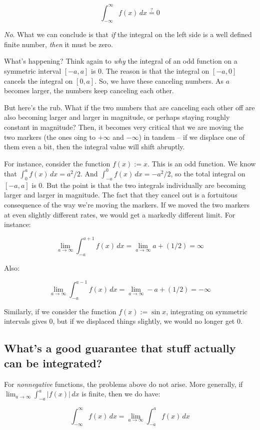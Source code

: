 \documentclass[10pt]{amsart}
\begin{document}
$$\int_{-\infty}^\infty f(x) \, dx \stackrel{?}{=} 0$$

{\em No}. What we can conclude is that {\em if} the integral on the
left side is a well defined finite number, {\em then} it must be zero.

What's happening? Think again to {\em why} the integral of an odd
function on a symmetric interval $[-a,a]$ is $0$. The reason is that
the integral on $[-a,0]$ cancels the integral on $[0,a]$. So, we have
these canceling numbers. As $a$ becomes larger, the numbers keep
canceling each other.

But here's the rub. What if the two numbers that are canceling each
other off are also becoming larger and larger in magnitude, or perhaps
staying roughly constant in magnitude? Then, it becomes very critical
that we are moving the two markers (the ones oing to $+\infty$ and
$-\infty$) in tandem -- if we displace one of them even a bit, then
the integral value will shift abruptly.

For instance, consider the function $f(x) := x$. This is an odd
function. We know that $\int_0^a f(x) \, dx = a^2/2$. And $\int_{-a}^0
f(x) \, dx = -a^2/2$, so the total integral on $[-a,a]$ is $0$. But
the point is that the two integrals individually are becoming larger
and larger in magnitude. The fact that they cancel out is a fortuitous
consequence of the way we're moving the markers. If we moved the two
markers at even slightly different rates, we would get a markedly
different limit. For instance:

$$\lim_{a \to \infty} \int_{-a}^{a + 1} f(x) \, dx = \lim_{a \to \infty} a + (1/2) = \infty$$

Also:

$$\lim_{a \to \infty} \int_{-a}^{a - 1} f(x) \, dx = \lim_{a \to \infty} -a + (1/2) = -\infty$$

Similarly, if we consider the function $f(x) := \sin x$, integrating
on symmetric intervals gives $0$, but if we displaced things slightly,
we would no longer get $0$.

\subsection{What's a good guarantee that stuff actually can be integrated?}

For {\em nonnegative} functions, the problems above do not arise. More
generally, if $\lim_{a \to \infty} \int_{-a}^a |f(x)| \, dx$ is
finite, then we do have:

$$\int_{-\infty}^\infty f(x) \, dx = \lim_{a \to \infty} \int_{-a}^a f(x) \, dx$$
\end{document}
